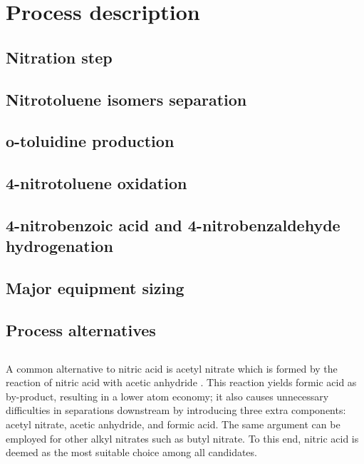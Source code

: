 \section{Process description}
\label{sec:process}
\subsection{Nitration step}

\subsection{Nitrotoluene isomers separation}



\subsection{o-toluidine production}

\subsection{4-nitrotoluene oxidation}

\subsection{4-nitrobenzoic acid and 4-nitrobenzaldehyde hydrogenation}


\subsection{Major equipment sizing}


\subsection{Process alternatives}
\subsection{}
A common alternative to nitric acid is acetyl nitrate which is formed by the reaction of nitric acid with acetic anhydride \cite{vassena_selective_1999}. This reaction yields formic acid as by-product, resulting in a lower atom economy; it also causes unnecessary difficulties in separations downstream by introducing three extra components: acetyl nitrate, acetic anhydride, and formic acid. The same argument can be employed for other alkyl nitrates such as butyl nitrate. To this end, nitric acid is deemed as the most suitable choice among all candidates.

